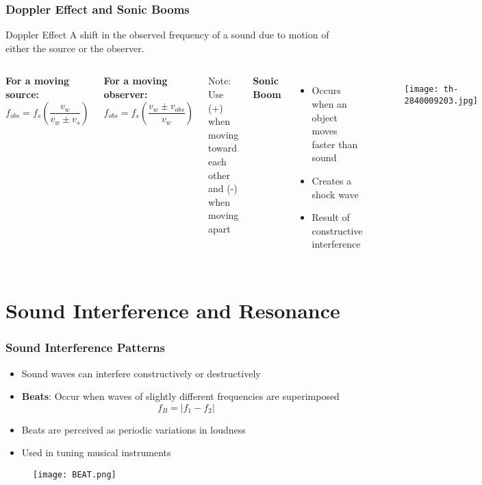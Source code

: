 \documentclass{beamer}
\begin{document}
\begin{frame}
\frametitle{Doppler Effect and Sonic Booms}
\begin{block}{Doppler Effect}
A shift in the observed frequency of a sound due to motion of either the source or the observer.
\end{block}

\begin{columns}
\textbf{For a moving source:}
\begin{equation}
f_{obs} = f_s\left(\frac{v_w}{v_w \pm v_s}\right)
\end{equation}

\textbf{For a moving observer:}
\begin{equation}
f_{obs} = f_s\left(\frac{v_w \pm v_{obs}}{v_w}\right)
\end{equation}

Note: Use (+) when moving toward each other and (-) when moving apart

\textbf{Sonic Boom}
\begin{itemize}
\item Occurs when an object moves faster than sound
\item Creates a shock wave
\item Result of constructive interference
\end{itemize}
\begin{figure}
    \centering
    \texttt{[image: th-2840009203.jpg]}
\end{figure}
\end{columns}
\end{frame}

\section{Sound Interference and Resonance}

\begin{frame}
\frametitle{Sound Interference Patterns}
\begin{itemize}
\item Sound waves can interfere constructively or destructively
\item \textbf{Beats}: Occur when waves of slightly different frequencies are superimposed
\begin{equation}
f_B = |f_1 - f_2|
\end{equation}
\item Beats are perceived as periodic variations in loudness
\item Used in tuning musical instruments
\end{itemize}
\begin{figure}
    \centering
    \texttt{[image: BEAT.png]}
\end{figure}
\end{frame}
\end{document}

